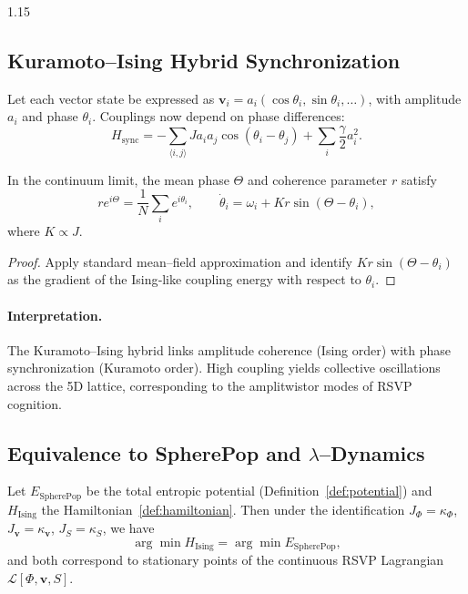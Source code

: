 \documentclass[12pt,a4paper]{article}
\begin{document}
\begin{spacing}{1.15}
\subsection{Kuramoto–Ising Hybrid Synchronization}

\begin{definition}
Let each vector state be expressed as
$\mathbf{v}_i = a_i(\cos\theta_i,\sin\theta_i,\ldots)$,
with amplitude $a_i$ and phase $\theta_i$.
Couplings now depend on phase differences:
\[
H_{\text{sync}} =
 -\!\!\sum_{\langle i,j\rangle}\!
   J a_i a_j \cos(\theta_i-\theta_j)
 + \sum_i \frac{\gamma}{2}a_i^2.
\]
\end{definition}

\begin{theorem}
\label{thm:kuramoto}
In the continuum limit, the mean phase $\Theta$
and coherence parameter $r$ satisfy
\[
r e^{i\Theta}
 = \frac{1}{N}\sum_i e^{i\theta_i},
 \qquad
\dot{\theta}_i = \omega_i + K r \sin(\Theta-\theta_i),
\]
where $K\propto J$.
\end{theorem}

\begin{proof}
Apply standard mean–field approximation
and identify $K r\sin(\Theta-\theta_i)$
as the gradient of the Ising‐like coupling energy
with respect to $\theta_i$.
\end{proof}

\paragraph{Interpretation.}
The Kuramoto–Ising hybrid links
amplitude coherence (Ising order)
with phase synchronization (Kuramoto order).
High coupling yields collective oscillations across the 5D lattice,
corresponding to the amplitwistor modes
of RSVP cognition.

\subsection{Equivalence to SpherePop and $\lambda$–Dynamics}

\begin{theorem}
\label{thm:equiv}
Let $E_{\text{SpherePop}}$ be the total entropic potential
(Definition~\ref{def:potential})
and $H_{\text{Ising}}$ the Hamiltonian~\eqref{def:hamiltonian}.
Then under the identification
$J_\Phi=\kappa_\Phi$, $J_{\mathbf{v}}=\kappa_{\mathbf{v}}$,
$J_S=\kappa_S$, we have
\[
\arg\min H_{\text{Ising}}
 = \arg\min E_{\text{SpherePop}},
\]
and both correspond to stationary points of
the continuous RSVP Lagrangian
$\mathcal{L}[\Phi,\mathbf{v},S]$.
\end{theorem}


\end{spacing}
\end{document}
